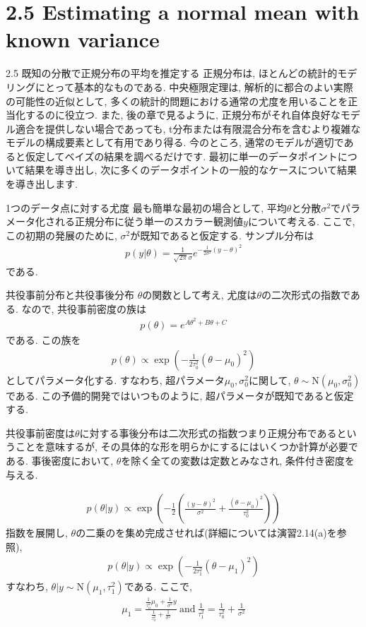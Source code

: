 \documentclass[10pt,dvipdfmx,a4]{beamer}
\newcommand{\eq}[1]{\begin{align}#1\end{align}}
\newcommand{\eqn}[1]{\begin{align*}#1\end{align*}}
\begin{document}
\section{2.5 Estimating a normal mean with known variance}
\begin{frame}{2.5 既知の分散で正規分布の平均を推定する}
正規分布は, ほとんどの統計的モデリングにとって基本的なものである.
中央極限定理は, 解析的に都合のよい実際の可能性の近似として, 多くの統計的問題における通常の尤度を用いることを正当化するのに役立つ.
また, 後の章で見るように, 正規分布がそれ自体良好なモデル適合を提供しない場合であっても, t分布または有限混合分布を含むより複雑なモデルの構成要素として有用であり得る.
今のところ, 通常のモデルが適切であると仮定してベイズの結果を調べるだけです.
最初に単一のデータポイントについて結果を導き出し, 次に多くのデータポイントの一般的なケースについて結果を導き出します.
\end{frame}


\begin{frame}{1つのデータ点に対する尤度}
最も簡単な最初の場合として, 平均$\theta$と分散$\sigma^2$でパラメータ化される正規分布に従う単一のスカラー観測値$y$について考える.
ここで, この初期の発展のために, $\sigma^2$が既知であると仮定する.
サンプル分布は
\eqn{p(y|\theta)=\frac{1}{\sqrt{2\pi}\sigma}e^{-\frac{1}{2\sigma^2}(y-\theta)^2}}
である.
\end{frame}


\begin{frame}{共役事前分布と共役事後分布}
$\theta$の関数として考え, 尤度は$\theta$の二次形式の指数である.
なので, 共役事前密度の族は
\eqn{p(\theta)=e^{A\theta^2+B\theta+C}}
である.
この族を
\eqn{p(\theta)\propto \exp\left(-\frac{1}{2\tau_0^2}(\theta-\mu_0)^2\right)}
としてパラメータ化する.
すなわち, 超パラメータ$\mu_0, \sigma_0^2$に関して, $\theta\sim\text{N}(\mu_0,\sigma_0^2)$である.
この予備的開発ではいつものように, 超パラメータが既知であると仮定する.

共役事前密度は$\theta$に対する事後分布は二次形式の指数つまり正規分布であるということを意味するが, その具体的な形を明らかにするにはいくつか計算が必要である.
事後密度において, $\theta$を除く全ての変数は定数とみなされ, 条件付き密度を与える.
\end{frame}


\begin{frame}
\eqn{p(\theta|y)\propto \exp \left( -\frac{1}{2} \left( \frac{(y-\theta)^2}{\sigma^2}+\frac{(\theta-\mu_0)^2}{\tau_0^2} \right) \right)}
指数を展開し, $\theta$の二乗のを集め完成させれば(詳細については演習2.14(a)を参照),
\eq{p(\theta|y)\propto \exp\left(-\frac{1}{2\tau_1^2}(\theta-\mu_1)^2\right)}
すなわち, $\theta|y\sim\text{N}(\mu_1,\tau_1^2)$である.
ここで,
\eq{\mu_1=\frac{\tfrac{1}{\tau_0^2}\mu_0+\tfrac{1}{\sigma^2}y}{\tfrac{1}{\tau_0^2}+\tfrac{1}{\sigma^2}}\ \text{and}\  \frac{1}{\tau_1^2}=\frac{1}{\tau_0^2}+\frac{1}{\sigma^2}}
\end{frame}
\end{document}
